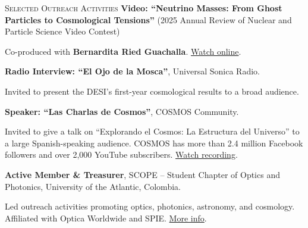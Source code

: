 \begin{rubric}{\faBullhorn \textsc{Selected Outreach Activities}}
\entry*[]
\textbf{Video: ``Neutrino Masses: From Ghost Particles to Cosmological Tensions''} (2025 Annual Review of Nuclear and Particle Science Video Contest) \par
Co-produced with \textbf{Bernardita Ried Guachalla}. 
\href{https://www.youtube.com/watch?v=kna3FfmKTG8&t=18s}{Watch online}.

\entry*[]
\textbf{Radio Interview: ``El Ojo de la Mosca''}, Universal Sonica Radio. \par
Invited to present the DESI’s first-year cosmological results to a broad audience.

\entry*[]
\textbf{Speaker: ``Las Charlas de Cosmos''}, COSMOS Community. \par
Invited to give a talk on ``Explorando el Cosmos: La Estructura del Universo'' to a large Spanish-speaking audience. COSMOS has more than 2.4 million Facebook followers and over 2,000 YouTube subscribers. 
\href{https://www.youtube.com/watch?v=ui7ZfEto-Ws}{Watch recording}.

\entry*[]
\textbf{Active Member \& Treasurer}, SCOPE – Student Chapter of Optics and Photonics, University of the Atlantic, Colombia. \par
Led outreach activities promoting optics, photonics, astronomy, and cosmology. Affiliated with Optica Worldwide and SPIE. 
\href{https://henoriega.github.io/outreach/outreach4/}{More info}.


\end{rubric}


